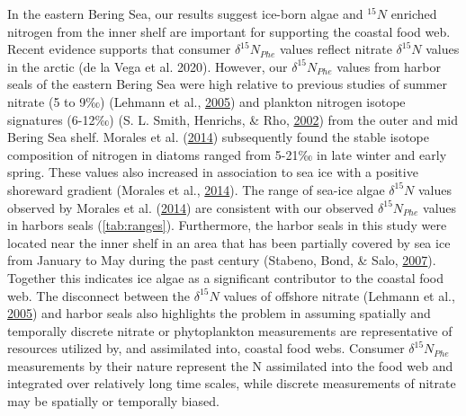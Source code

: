 \documentclass [11pt, proquest] {uwthesis}[2015/03/03]
\begin{document}
In the eastern Bering Sea, our results suggest ice-born algae and
\(^{15}N\) enriched nitrogen from the inner shelf are important for
supporting the coastal food web. Recent evidence supports that consumer
\(\delta^{15}N_{Phe}\) values reflect nitrate \(\delta^{15}N\) values in
the arctic (de la Vega et al. 2020). However, our \(\delta^{15}N_{Phe}\)
values from harbor seals of the eastern Bering Sea were high relative to
previous studies of summer nitrate (5 to 9‰) (Lehmann et al.,
\protect\hyperlink{ref-Lehmann2005}{2005}) and plankton nitrogen isotope
signatures (6-12‰) (S. L. Smith, Henrichs, \& Rho,
\protect\hyperlink{ref-Smith2002}{2002}) from the outer and mid Bering
Sea shelf. Morales et al. (\protect\hyperlink{ref-Morales2014}{2014})
subsequently found the stable isotope composition of nitrogen in diatoms
ranged from 5-21‰ in late winter and early spring. These values also
increased in association to sea ice with a positive shoreward gradient
(Morales et al., \protect\hyperlink{ref-Morales2014}{2014}). The range
of sea-ice algae \(\delta^{15}N\) values observed by Morales et al.
(\protect\hyperlink{ref-Morales2014}{2014}) are consistent with our
observed \(\delta^{15}N_{Phe}\) values in harbors seals
(\ref{tab:ranges}). Furthermore, the harbor seals in this study were
located near the inner shelf in an area that has been partially covered
by sea ice from January to May during the past century (Stabeno, Bond,
\& Salo, \protect\hyperlink{ref-Stabeno2007}{2007}). Together this
indicates ice algae as a significant contributor to the coastal food
web. The disconnect between the \(\delta^{15}N\) values of offshore
nitrate (Lehmann et al., \protect\hyperlink{ref-Lehmann2005}{2005}) and
harbor seals also highlights the problem in assuming spatially and
temporally discrete nitrate or phytoplankton measurements are
representative of resources utilized by, and assimilated into, coastal
food webs. Consumer \(\delta^{15}N_{Phe}\) measurements by their nature
represent the N assimilated into the food web and integrated over
relatively long time scales, while discrete measurements of nitrate may
be spatially or temporally biased.
\end{document}

